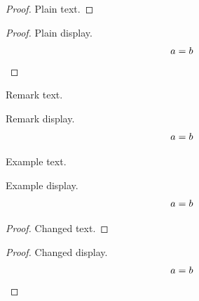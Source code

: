 \documentclass{article}
\newenvironment{example}
  {\pushQED{\qed}\renewcommand{\qedsymbol}{$\triangle$}\par}{\popQED\par}
\begin{document}
\begin{proof}
Plain text.
\end{proof}
\begin{proof}
Plain display.
\[ a = b \qedhere \]
\end{proof}
\begin{remark}
Remark text.
\end{remark}
\begin{remark}
Remark display.
\[ a = b \qedhere \]
\end{remark}
\begin{example}
Example text.
\end{example}
\begin{example}
Example display.
\[ a = b \qedhere \]
\end{example}
\renewcommand{\qedsymbol}{$\blacksquare$}
\begin{proof}
Changed text.
\end{proof}
\begin{proof}
Changed display.
\[ a = b \qedhere \]
\end{proof}
\end{document}
